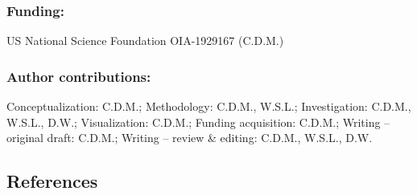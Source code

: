 \documentclass[
  letterpaper,
  DIV=11,
  numbers=noendperiod]{scrartcl}
\begin{document}
\begin{linenumbers}
\begin{doublespace}
\subsubsection{Funding:}\label{funding}

US National Science Foundation OIA-1929167 (C.D.M.)

\subsubsection{Author contributions:}\label{author-contributions}

Conceptualization: C.D.M.; Methodology: C.D.M., W.S.L.; Investigation:
C.D.M., W.S.L., D.W.; Visualization: C.D.M.; Funding acquisition:
C.D.M.; Writing -- original draft: C.D.M.; Writing -- review \& editing:
C.D.M., W.S.L., D.W.

\end{doublespace}
\end{linenumbers}

\subsection{References}\label{references}
\end{document}
